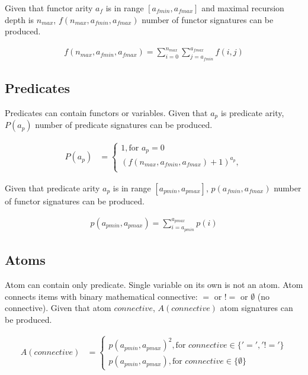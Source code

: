 Given that functor arity $a_f$ is in range $[a_{fmin}, a_{fmax}]$  and maximal recursion depth is $n_{max}$, $f(n_{max}, a_{fmin}, a_{fmax})$ number of functor signatures can be produced.

\begin{align}
  f(n_{max}, a_{fmin}, a_{fmax}) = \sum_{i=0}^{n_{max}} \sum_{j=a_{fmin}}^{a_{fmax}} f(i, j) \label{eq:functor}
\end{align}

\subsection{Predicates}

Predicates can contain functors or variables.
Given that $a_p$ is predicate arity, $P(a_p)$ number of predicate signatures can be produced.

\begin{align}
	P(a_p) &=
	\begin{cases}
		1, \text{for } a_p = 0 \\
		(f(n_{max}, a_{fmin}, a_{fmax}) + 1)^{a_p}, \\
	\end{cases}
\end{align}

Given that predicate arity $a_p$ is in range $[a_{pmin}, a_{pmax}]$, $p(a_{fmin}, a_{fmax})$ number of functor signatures can be produced.

\begin{align}
  p(a_{pmin}, a_{pmax}) = \sum_{i=a_{pmin}}^{a_{pmax}} p(i) \label{eq:predicate}
\end{align}

\subsection{Atoms}

Atom can contain only predicate. Single variable on its own is not an atom. Atom connects items with binary mathematical connective: $=$ or $!=$ or $\emptyset$ (no connective).
Given that atom $connective$, $A(connective)$ atom signatures can be produced.

\begin{align}
	A(connective) &= 
  \begin{cases}
    p(a_{pmin}, a_{pmax})^{2}, \text{for } connective \in \{'=', '!='\} \\
    p(a_{pmin}, a_{pmax}), \text{for } connective \in \{\emptyset\} \label{eq:atom}
  \end{cases}
\end{align}

